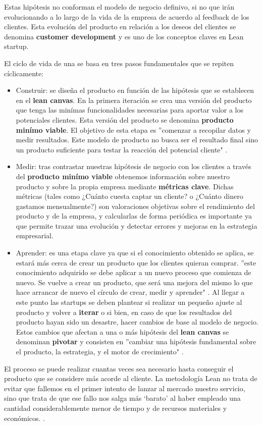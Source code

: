 Estas hipótesis no conforman el modelo de negocio definivo, si no que irán evolucionando a lo largo de la vida de la empresa de acuerdo al feedback de los clientes. Esta evolución del producto en relación a los deseos del clientes se denomina \textbf{customer development} y es uno de los conceptos claves en Lean startup.

El ciclo de vida de una  se basa en tres pasos fundamentales que se repiten cíclicamente:
\begin{itemize}
	\item Construir: se diseña el producto en función de las hipótesis que se establecen en el \textbf{lean canvas}. En la primera iteración se crea una versión del producto que tenga las minímas funcionalidades necesarias para aportar valor a los potenciales clientes. Esta versión del producto se denomina \textbf{producto minímo viable}. El objetivo de esta etapa es ''comenzar a recopilar datos y medir resultados. Este modelo de producto no busca ser el resultado final sino un producto suficiente para testar la reacción del potencial cliente" \cite{antevenio2016}.
	\item Medir: tras contrastar nuestras hipótesis de negocio con los clientes a través del \textbf{producto minímo viable} obtenemos información sobre nuestro producto y sobre la propia empresa mediante \textbf{métricas clave}. Dichas métricas (tales como ¿Cuánto cuesta captar un cliente? o ¿Cuánto dinero gastamos mensualmente?) son valoraciones objetivas sobre el rendimiento del producto y de la empresa, y calcularlas de forma periódica es importante ya que permite trazar una evolución y detectar errores y mejoras en la estrategia empresarial.
	\item Aprender: es una etapa clave ya que si el conocimiento obtenido se aplica, se estará más cerca de crear un producto que los clientes quieran comprar. ''este conocimiento adquirido se debe aplicar a un nuevo proceso que comienza de nuevo. Se vuelve a crear un producto, que será una mejora del mismo lo que hace arrancar de nuevo el círculo de crear, medir y aprender" \cite{antevenio2016}. Al llegar a este punto las startups se deben plantear si realizar un pequeño ajuste al producto y volver a \textbf{iterar} o si bien, en caso de que los resultados del producto hayan sido un desastre, hacer cambios de base al modelo de negocio. Estos cambios que afectan a una o más hipótesis del \textbf{lean canvas} se denominan \textbf{pivotar} y consisten en ''cambiar una hipótesis fundamental sobre el producto, la estrategia, y el motor de crecimiento" \cite{emooc}.
\end{itemize}

El proceso se puede realizar cuantas veces sea necesario hasta conseguir el producto que se considere más acorde al cliente. La metodología Lean  no trata de evitar que fallemos en el primer intento de lanzar al mercado nuestro servicio, sino que trata de que ese fallo nos salga más ‘barato’ al haber empleado una cantidad considerablemente menor de tiempo y de recursos materiales y económicos. \cite{andreapelaez} .





